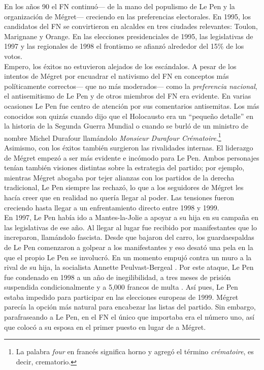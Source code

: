 En los años 90 el FN continuó--- de la mano del populismo de Le Pen y la organización de Mégret--- creciendo en las preferencias electorales. En 1995, los candidatos del FN se convirtieron en alcaldes en tres ciudades relevantes: Toulon, Marignane y Orange. En las elecciones presidenciales de 1995, las legislativas de 1997 y las regionales de 1998 el frontismo se afianzó alrededor del 15\% de los votos.\\

Empero, los éxitos no estuvieron alejados de los escándalos. A pesar de los intentos de Mégret por encuadrar el nativismo del FN en conceptos más políticamente correctos--- que no más moderados--- como la \textit{preferencia nacional}, el antisemitismo de Le Pen y de otros miembros del FN era evidente. En varias ocasiones Le Pen fue centro de atención por sus comentarios antisemitas. Los más conocidos son quizás cuando dijo que el Holocausto era un ``pequeño detalle'' en la historia de la Segunda Guerra Mundial o cuando se burló de un ministro de nombre Michel Durafour llamándolo \textit{Monsieur Durafour Crématoire}.\footnote{La palabra \textit{four} en francés significa horno y agregó el término \textit{crématoire}, es decir, crematorio.}\\ 

Asimismo, con los éxitos también surgieron las rivalidades internas. El liderazgo de Mégret empezó a ser más evidente e incómodo para Le Pen. Ambos personajes tenían también visiones distintas sobre la estrategia del partido; por ejemplo, mientras Mégret abogaba por tejer alianzas con los partidos de la derecha tradicional, Le Pen siempre las rechazó, lo que a los seguidores de Mégret les hacía creer que en realidad no quería llegar al poder. Las tensiones fueron creciendo hasta llegar a un enfrentamiento directo entre 1998 y 1999.\\ 

En 1997, Le Pen había ido a Mantes-la-Jolie a apoyar a su hija en su campaña en las legislativas de ese año. Al llegar al lugar fue recibido por manifestantes que lo increparon, llamándolo fascista. Desde que bajaron del carro, los guardaespaldas de Le Pen comenzaron a golpear a los manifestantes y eso desató una pela en la que el propio Le Pen se involucró. En un momento empujó contra un muro a la rival de su hija, la socialista Annette Peulvast-Bergeal \parencite{InaPolitique97}. Por este ataque, Le Pen fue condenado en 1998 a un año de inegilibilidad, a tres meses de prisión suspendida condicionalmente y a 5,000 francos de multa \parencite{LesEchos99}. Así pues, Le Pen estaba impedido para participar en las elecciones europeas de 1999. Mégret parecía la opción más natural para encabezar las listas del partido. Sin embargo, parafraseando a Le Pen, en el FN el único que importaba era el número uno, así que colocó a su esposa en el primer puesto en lugar de a Mégret.\\ 

